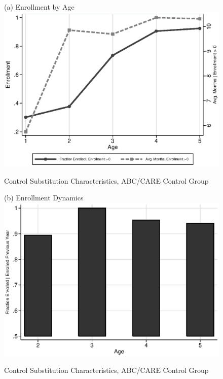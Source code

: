 \documentclass[static]{JJH-Beamer}
\begin{document}

\begin{figure}[H]
\caption{Control Substitution Characteristics, ABC/CARE Control Group}\label{fig:control-sub} \label{fig:salmonella}
\begin{center}
(a) Enrollment by Age \\
\includegraphics[width=.7\textwidth]{output/abccare_Valtenrollment.eps}
\end{center}
\end{figure}

\begin{figure}[H]
\addtocounter{figure}{-1}
\caption{Control Substitution Characteristics, ABC/CARE Control Group}\label{fig:control-sub} \label{fig:treatsubcare_2}
\begin{center}
(b) Enrollment Dynamics \\
\includegraphics[width=.7\textwidth]{output/abccare_Vprobs.eps}
\end{center}
\end{figure}
\end{document}
